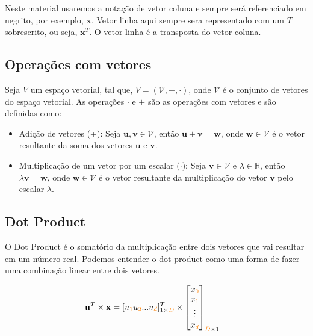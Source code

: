 Neste material usaremos a notação de vetor coluna e sempre será referenciado em negrito, por exemplo, $\mathbf{x}$. Vetor linha aqui sempre sera representado com um $T$ sobrescrito, ou seja, $\mathbf{x}^T$. O vetor linha é a transposta do vetor coluna.
\subsection{Operações com vetores}
Seja $V$ um espaço vetorial, tal que, $V=(\mathcal{V}, +, \cdot)$, onde $\mathcal{V}$ é o conjunto de vetores do espaço vetorial. As operações $ \cdot $ e $+$ são as operações com vetores e são definidas como:
\begin{itemize}
    \item Adição de vetores (+): Seja $\mathbf{u}, \mathbf{v} \in \mathcal{V}$, então $\mathbf{u} + \mathbf{v} = \mathbf{w}$, onde $\mathbf{w} \in \mathcal{V}$ é o vetor resultante da soma dos vetores $\mathbf{u}$ e $\mathbf{v}$.
    \item Multiplicação de um vetor por um escalar ($\cdot$): Seja $\mathbf{v} \in \mathcal{V}$ e $\lambda \in \mathbb{R}$, então $\lambda\mathbf{v} = \mathbf{w}$, onde $\mathbf{w}  \in \mathcal{V}$ é o vetor resultante da multiplicação do vetor $\mathbf{v}$ pelo escalar $\lambda$.
\end{itemize}
\subsection{Dot Product}
O Dot Product é o somatório da multiplicação entre dois vetores que vai resultar em um número real. Podemos entender o dot product como uma forma de fazer uma combinação linear entre dois vetores.

\vspace{0.5cm}

\begin{equation}
\begin{aligned}
    \mathbf{u}^T \times \mathbf{x} = [u_{\mathcolor{orange}{1}} u_{\mathcolor{orange}{2}} ... u_{\mathcolor{orange}{d}}]^T_{1 \times\mathcolor{orange}{D} }\times 
    \begin{bmatrix}
    x_{\mathcolor{orange}{0}} \\
    x_{\mathcolor{orange}{1}} \\
    \vdots \\
    x_{\mathcolor{orange}{d}}
\end{bmatrix}_{\mathcolor{orange}{D}\times 1} \quad \\
\end{aligned}
\end{equation}


